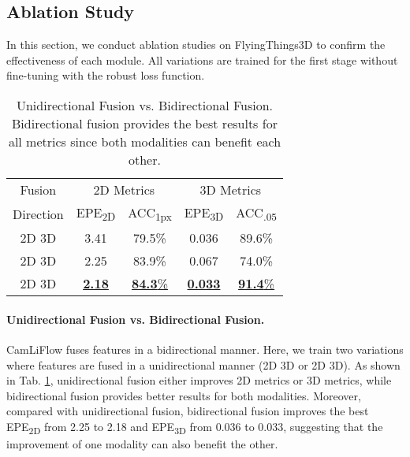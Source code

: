 \documentclass[10pt,twocolumn,letterpaper]{article}
\begin{document}
\subsection{Ablation Study}
\label{sec:ablation}

In this section, we conduct ablation studies on FlyingThings3D to confirm the effectiveness of each module. All variations are trained for the first stage without fine-tuning with the robust loss function.

\begin{table}[t]
    \centering
    \begin{tabular}{c|cc|cc}
    \hline
    Fusion & \multicolumn{2}{c|}{2D Metrics} & \multicolumn{2}{c}{3D Metrics} \\
    Direction & EPE\textsubscript{2D} & ACC\textsubscript{1px} & EPE\textsubscript{3D} & ACC\textsubscript{.05} \\
    \hline
    2D  3D      & 3.41 & 79.5\% & 0.036 & 89.6\% \\
    2D  3D       & 2.25 & 83.9\% & 0.067 & 74.0\% \\
    2D  3D  & \underline{\textbf{2.18}} & \underline{\textbf{84.3}\%} & \underline{\textbf{0.033}} & \underline{\textbf{91.4}\%} \\
    \hline
    \end{tabular}
    \vspace{-5pt}
    \caption{Unidirectional Fusion vs. Bidirectional Fusion. Bidirectional fusion provides the best results for all metrics since both modalities can benefit each other.}
    \vspace{-15pt}
    \label{tab:ablation-fusion-direction}
\end{table}

\vspace{-10pt}
\paragraph{Unidirectional Fusion vs. Bidirectional Fusion.} CamLiFlow fuses features in a bidirectional manner. Here, we train two variations where features are fused in a unidirectional manner (2D  3D or 2D  3D). As shown in Tab. \ref{tab:ablation-fusion-direction}, unidirectional fusion either improves 2D metrics or 3D metrics, while bidirectional fusion provides better results for both modalities. Moreover, compared with unidirectional fusion, bidirectional fusion improves the best EPE\textsubscript{2D} from 2.25 to 2.18 and EPE\textsubscript{3D} from 0.036 to 0.033, suggesting that the improvement of one modality can also benefit the other.
\end{document}
